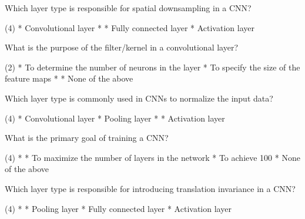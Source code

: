 \documentclass[10pt]{extarticle}
\begin{document}
\begin{exercise}
    Which layer type is responsible for spatial downsampling in a CNN?
    \begin{choice} (4)
        * Convolutional layer
        * 
        * Fully connected layer
        * Activation layer
    \end{choice}
\end{exercise}
\begin{solution}
\end{solution}

\begin{exercise}
    What is the purpose of the filter/kernel in a convolutional layer?
    \begin{choice} (2)
        * To determine the number of neurons in the layer
        * To specify the size of the feature maps
        * 
        * None of the above
    \end{choice}
\end{exercise}
\begin{solution}
\end{solution}

\begin{exercise}
    Which layer type is commonly used in CNNs to normalize the input data?
    \begin{choice} (4)
        * Convolutional layer
        * Pooling layer
        * 
        * Activation layer
    \end{choice}
\end{exercise}
\begin{solution}
\end{solution}

\begin{exercise}
    What is the primary goal of training a CNN?
    \begin{choice} (4)
        * 
        * To maximize the number of layers in the network
        * To achieve 100%
        * None of the above
    \end{choice}
\end{exercise}
\begin{solution}
\end{solution}



\begin{exercise}
    Which layer type is responsible for introducing translation invariance in a CNN?
    \begin{choice} (4)
        * 
        * Pooling layer
        * Fully connected layer
        * Activation layer
    \end{choice}
\end{exercise}
\begin{solution}
\end{solution}
\end{document}
